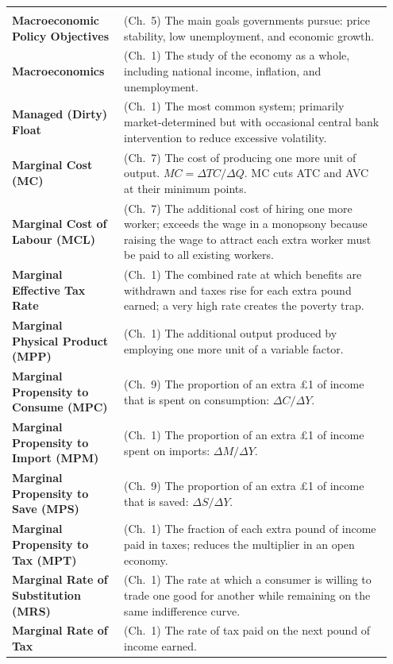 \documentclass[11pt, a4paper, twoside]{book}
\begin{document}
\begin{longtable}{@{}>{\RaggedRight\arraybackslash}p{0.28\linewidth}>{\RaggedRight\arraybackslash}p{0.67\linewidth}@{}}
\multicolumn{2}{@{}l}{\textbf{\Large\color{CurveNavy} M}} \\[2pt]
\textbf{Macroeconomic Policy Objectives} & (Ch.~5) The main goals governments pursue: price stability, low unemployment, and economic growth. \\
\textbf{Macroeconomics} & (Ch.~1) The study of the economy as a whole, including national income, inflation, and unemployment. \\
\textbf{Managed (Dirty) Float} & (Ch.~1) The most common system; primarily market-determined but with occasional central bank intervention to reduce excessive volatility. \\
\textbf{Marginal Cost (MC)} & (Ch.~7) The cost of producing one more unit of output. $MC = \Delta TC / \Delta Q$. MC cuts ATC and AVC at their minimum points. \\
\textbf{Marginal Cost of Labour (MCL)} & (Ch.~7) The additional cost of hiring one more worker; exceeds the wage in a monopsony because raising the wage to attract each extra worker must be paid to all existing workers. \\
\textbf{Marginal Effective Tax Rate} & (Ch.~1) The combined rate at which benefits are withdrawn and taxes rise for each extra pound earned; a very high rate creates the poverty trap. \\
\textbf{Marginal Physical Product (MPP)} & (Ch.~1) The additional output produced by employing one more unit of a variable factor. \\
\textbf{Marginal Propensity to Consume (MPC)} & (Ch.~9) The proportion of an extra £1 of income that is spent on consumption: $\Delta C / \Delta Y$. \\
\textbf{Marginal Propensity to Import (MPM)} & (Ch.~1) The proportion of an extra £1 of income spent on imports: $\Delta M / \Delta Y$. \\
\textbf{Marginal Propensity to Save (MPS)} & (Ch.~9) The proportion of an extra £1 of income that is saved: $\Delta S / \Delta Y$. \\
\textbf{Marginal Propensity to Tax (MPT)} & (Ch.~1) The fraction of each extra pound of income paid in taxes; reduces the multiplier in an open economy. \\
\textbf{Marginal Rate of Substitution (MRS)} & (Ch.~1) The rate at which a consumer is willing to trade one good for another while remaining on the same indifference curve. \\
\textbf{Marginal Rate of Tax} & (Ch.~1) The rate of tax paid on the next pound of income earned. \\

\end{longtable}
\end{document}
